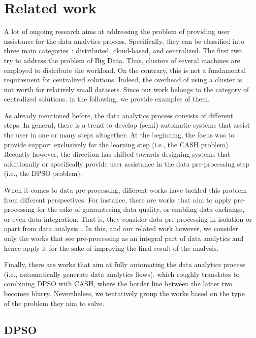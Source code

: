 \section{Related work}
\label{sec:relatedwork}
A lot of ongoing research aims at addressing the problem of providing user assistance for the data analytics process.
Specifically, they can be classified into three main categories~\cite{elshawi2019automated}: distributed, cloud-based, and centralized. The first two try to address the problem of Big Data. Thus, clusters of several machines are employed to distribute the workload. On the contrary, this is not a fundamental requirement for centralized solutions. Indeed, the overhead of using a cluster is not worth for relatively small datasets. 
Since our work belongs to the category of centralized solutions, in the following, we provide examples of them.

As already mentioned before, the data analytics process consists of different steps. In general, there is a trend to develop (semi) automatic systems that assist the user in one or many steps altogether. At the beginning, the focus was to provide support exclusively for the learning step (i.e., the CASH problem). Recently however, the direction has shifted towards designing systems that additionally or specifically provide user assistance in the data pre-processing step (i.e., the DPSO problem).

When it comes to data pre-processing, different works have tackled this problem from different perspectives. For instance, there are works that aim to apply pre-processing for the sake of guaranteeing data quality, or enabling data exchange, or even data integration. That is, they consider data pre-processing in isolation or apart from data analysis~\cite{Llunatic13VLDBEnd,BigDansing15SIGMOD,Katara15SIGMOD,Foofah17SIGMOD}. In this, and our related work however, we consider only the works that see pre-processing as an integral part of data analytics and hence apply it for the sake of improving the final result of the analysis.


Finally, there are works that aim at fully automating the data analytics process (i.e., automatically generate data analytics flows), which roughly translates to combining DPSO with CASH, where the border line between the latter two becomes blurry. Nevertheless, we tentatively group the works based on the type of the problem they aim to solve.

\subsection{DPSO}


